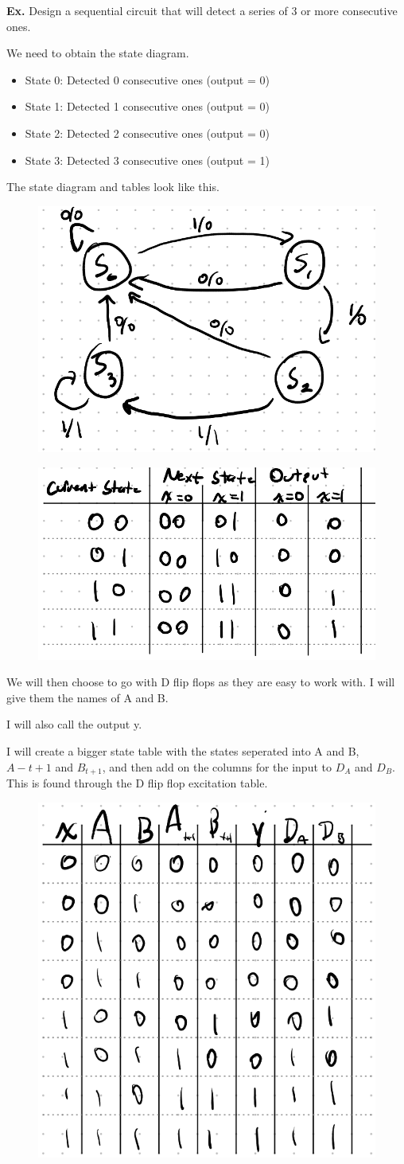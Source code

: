 \documentclass[12pt,letterpaper]{article} \usepackage{amsmath} \usepackage{graphicx}  \usepackage{longtable}  \usepackage{amssymb}
\begin{document}
        \begin{mdframed}
            \textbf{Ex. } Design a sequential circuit that will detect a series of 3 or more consecutive ones.

            We need to obtain the state diagram.
            \begin{itemize}[noitemsep]
                \item State 0: Detected 0 consecutive ones (output = 0)
                \item State 1: Detected 1 consecutive ones (output = 0)
                \item State 2: Detected 2 consecutive ones (output = 0)
                \item State 3: Detected 3 consecutive ones (output = 1)
            \end{itemize}
            The state diagram and tables look like this.
            \begin{figure}[H]
                \centering
                \includegraphics[width=0.3\linewidth]{ex9.png}
            \end{figure}
            \begin{figure}[H]
                \centering
                \includegraphics[width=0.4\linewidth]{ex9-2.png}
            \end{figure}
            We will then choose to go with D flip flops as they are easy to work with. I will give them the names of A and B. 

            I will also call the output y.

            I will create a bigger state table with the states seperated into A and B, $A-{t+1}$ and $B_{t+1}$, and then add on the columns for the input to $D_A$ and $D_B$. This is found through the D flip flop excitation table. 
            \begin{figure}[H]
                \centering
                \includegraphics[width=0.4\linewidth]{ex9-3.png}
            \end{figure}


\end{mdframed}
\end{document}

